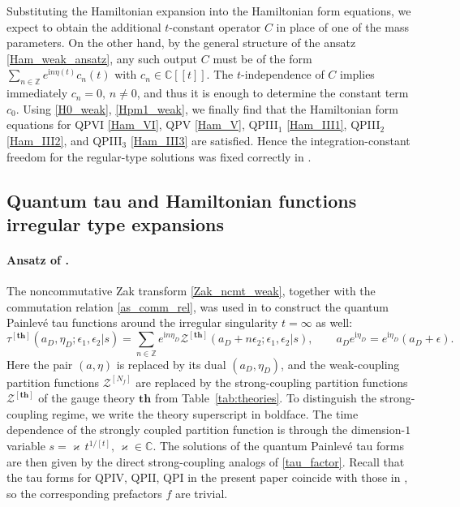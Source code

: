 \documentclass[12pt,a4paper]{article}
\numberwithin{equation}{section}
\newcommand{\ri}{\mathrm{i}}
\newcommand{\D}{\scriptscriptstyle{D}}
\begin{document}
Substituting the Hamiltonian expansion into the Hamiltonian form equations, we expect to obtain the additional $t$-constant operator $C$ in place of one of the mass parameters. On the other hand, by the general structure of the ansatz \eqref{Ham_weak_ansatz}, any such output $C$ must be of the form $\sum_{n\in\mathbb{Z}}e^{\ri n\eta(t)}c_n(t)$ with $c_n\in\mathbb{C}[[t]]$. The $t$-independence of $C$ implies immediately $c_n=0,\, n\neq0$, and thus it is enough to determine the constant term $c_0$. 
Using \eqref{H0_weak}, \eqref{Hpm1_weak}, we finally find that the Hamiltonian form equations for QPVI  \eqref{Ham_VI}, QPV \eqref{Ham_V},  QPIII$_1$ \eqref{Ham_III1}, QPIII$_2$ \eqref{Ham_III2}, and QPIII$_3$ \eqref{Ham_III3} are satisfied. Hence the integration-constant freedom for the regular-type solutions was fixed correctly in \cite{BST25}.

\subsection{Quantum tau and Hamiltonian functions irregular type expansions}
\label{ssec:large}
\paragraph{Ansatz of \cite{BST25}.}
The noncommutative Zak transform \eqref{Zak_ncmt_weak}, together with the commutation relation \eqref{as_comm_rel}, was used
in \cite[Sec. 4]{BST25} to construct the quantum Painlev\'e tau functions around the irregular singularity $t=\infty$ as well:
\begin{equation}\label{Zak_ncmt_comm_strong}
\tau^{[\mathbf{th}]}(a_{\D},\eta_{\D};\epsilon_1,\epsilon_2|s)=\sum_{n\in\mathbb{Z}}e^{\ri n \eta_{\D} }\mathcal{Z}^{[\mathbf{th}]}(a_{\D}+n\epsilon_2;\epsilon_1,\epsilon_2|s), \qquad a_{\D} e^{\ri \eta_{\D}}=e^{\ri \eta_{\D}} (a_{\D}+\epsilon).
\end{equation}
Here the pair $(a,\eta)$ is replaced by its dual $(a_{\D},\eta_{\D})$, and
the weak-coupling partition functions $\mathcal{Z}^{[N_f]}$ are replaced by the strong-coupling partition functions $\mathcal{Z}^{[\mathbf{th}]}$ of the gauge theory $\mathbf{th}$ from Table~\ref{tab:theories}.
To distinguish the strong-coupling regime, we write the theory superscript in boldface.
The time dependence of the strongly coupled partition function is through the dimension-$1$ variable $s=\varkappa\, t^{1/[t]}, \, \varkappa\in\mathbb{C}$. 
The solutions of the quantum Painlev\'e tau forms are then given by the direct strong-coupling analogs of \eqref{tau_factor}. Recall that the tau forms for QPIV, QPII, QPI in the present paper coincide with those in \cite{BST25}, so the corresponding prefactors $f$ are trivial.
\end{document}
